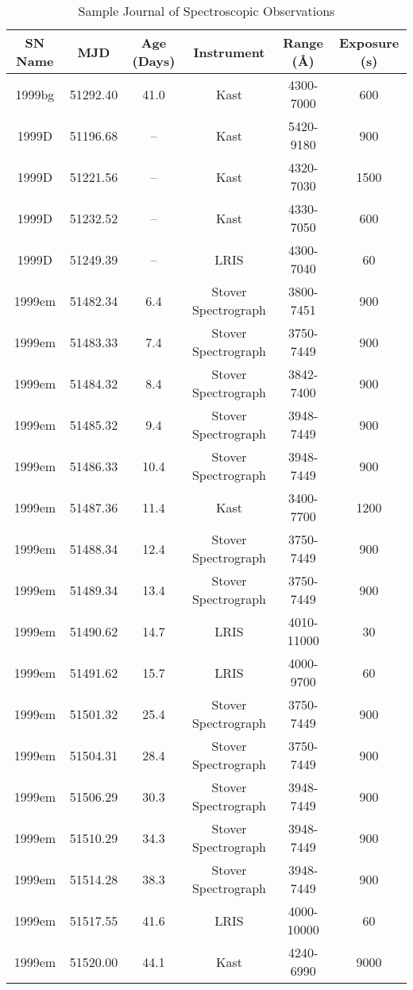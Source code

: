 
 
\begin{table*}
\caption{Sample Journal of Spectroscopic Observations}
\begin{tabular}{cccccc}
\hline\hline
SN Name &
MJD &
Age (Days) \tablenotemark{a} &
Instrument &
Range (\AA)&
Exposure (s)\\
\hline
1999bg	 & 51292.40	 &41.0	 &Kast	 & 4300-7000 &600 \\ 
1999D	 & 51196.68	 &--	 &Kast	 & 5420-9180 &900 \\ 
1999D	 & 51221.56	 &--	 &Kast	 & 4320-7030 &1500 \\ 
1999D	 & 51232.52	 &--	 &Kast	 & 4330-7050 &600 \\ 
1999D	 & 51249.39	 &--	 &LRIS	 & 4300-7040 &60 \\ 
1999em	 & 51482.34	 &6.4	 &Stover Spectrograph	 & 3800-7451 &900 \\ 
1999em	 & 51483.33	 &7.4	 &Stover Spectrograph	 & 3750-7449 &900 \\ 
1999em	 & 51484.32	 &8.4	 &Stover Spectrograph	 & 3842-7400 &900 \\ 
1999em	 & 51485.32	 &9.4	 &Stover Spectrograph	 & 3948-7449 &900 \\ 
1999em	 & 51486.33	 &10.4	 &Stover Spectrograph	 & 3948-7449 &900 \\ 
1999em	 & 51487.36	 &11.4	 &Kast	 & 3400-7700 &1200 \\ 
1999em	 & 51488.34	 &12.4	 &Stover Spectrograph	 & 3750-7449 &900 \\ 
1999em	 & 51489.34	 &13.4	 &Stover Spectrograph	 & 3750-7449 &900 \\ 
1999em	 & 51490.62	 &14.7	 &LRIS	 & 4010-11000 &30 \\ 
1999em	 & 51491.62	 &15.7	 &LRIS	 & 4000-9700 &60 \\ 
1999em	 & 51501.32	 &25.4	 &Stover Spectrograph	 & 3750-7449 &900 \\ 
1999em	 & 51504.31	 &28.4	 &Stover Spectrograph	 & 3750-7449 &900 \\ 
1999em	 & 51506.29	 &30.3	 &Stover Spectrograph	 & 3948-7449 &900 \\ 
1999em	 & 51510.29	 &34.3	 &Stover Spectrograph	 & 3948-7449 &900 \\ 
1999em	 & 51514.28	 &38.3	 &Stover Spectrograph	 & 3948-7449 &900 \\ 
1999em	 & 51517.55	 &41.6	 &LRIS	 & 4000-10000 &60 \\ 
1999em	 & 51520.00	 &44.1	 &Kast	 & 4240-6990 &9000 \\ 

\end{tabular}
\end{table*}
